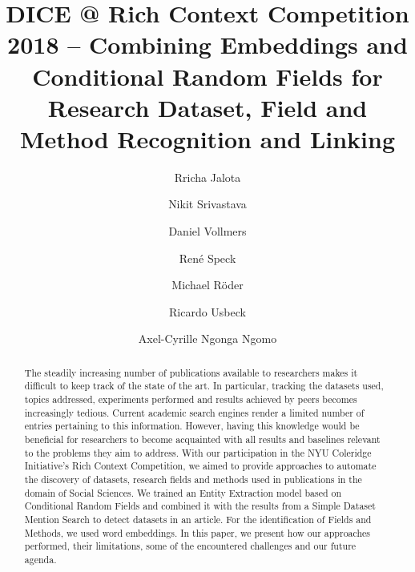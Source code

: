 \documentclass[runningheads]{llncs}
\title{DICE @ Rich Context Competition 2018 -- Combining Embeddings and Conditional Random Fields for Research Dataset, Field and Method Recognition and Linking}
\author{Rricha Jalota \and Nikit Srivastava \and Daniel Vollmers \and René Speck \and Michael R\"oder \and Ricardo Usbeck\orcidID{0000-0002-0191-7211} \and Axel-Cyrille {Ngonga Ngomo}}
\institute{
	Data Science Group, Paderborn University, Germany\\
	\email{firstname.lastname@uni-paderborn.de}
}
\begin{document}
	\maketitle
	
	\begin{abstract}
		The steadily increasing number of publications available to researchers makes it difficult to keep track of the state of the art. In particular, tracking the datasets used, topics addressed, experiments performed and results achieved by peers becomes increasingly tedious. Current academic search engines %
		render a limited number of entries pertaining to this information. However, having this knowledge would be beneficial for researchers to become acquainted with all results and baselines relevant to the problems they aim to address. With our participation in the NYU Coleridge Initiative’s Rich Context Competition, we aimed to provide approaches to automate the discovery of datasets, research fields and methods used in publications in the domain of Social Sciences. We trained an Entity Extraction model based on Conditional Random Fields and combined it with the results from a Simple Dataset Mention Search to detect datasets in an article.  For the identification of Fields and Methods, we used word embeddings. In this paper, we present how our approaches performed, their limitations, some of the encountered challenges and our future agenda. 
	\end{abstract}
	
	
\end{document}
